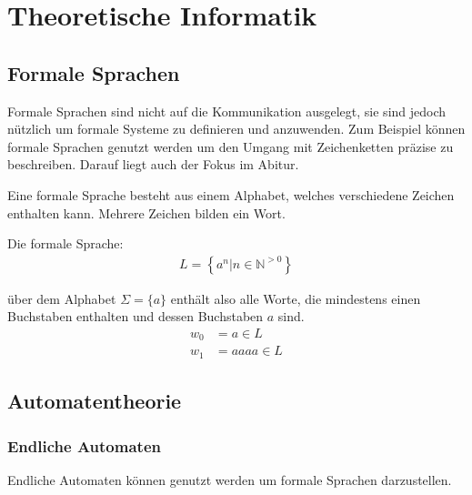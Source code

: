 \chapter{Theoretische Informatik}
\section{Formale Sprachen}
\begin{flushleft}
Formale Sprachen sind nicht auf die Kommunikation ausgelegt,
sie sind jedoch nützlich um formale Systeme zu definieren und anzuwenden.
Zum Beispiel können formale Sprachen genutzt werden um den Umgang mit
Zeichenketten präzise zu beschreiben.
Darauf liegt auch der Fokus im Abitur.

Eine formale Sprache besteht aus einem Alphabet, welches verschiedene Zeichen
enthalten kann. Mehrere Zeichen bilden ein Wort.
\end{flushleft}

\begin{flushleft}
Die formale Sprache:
\begin{align}
    L=\left\{a^n|n\in\mathbb{N}^{>0}\right\}
\end{align}

über dem Alphabet $\Sigma=\{a\}$ enthält also alle Worte,
die mindestens einen Buchstaben enthalten und dessen Buchstaben
$a$ sind.
\begin{align}
    w_0&=a\in L \\
    w_1&=aaaa\in L
\end{align}
\end{flushleft}

\section{Automatentheorie}
\subsection{Endliche Automaten}
\begin{flushleft}
Endliche Automaten können genutzt werden um formale Sprachen darzustellen.
\end{flushleft}

